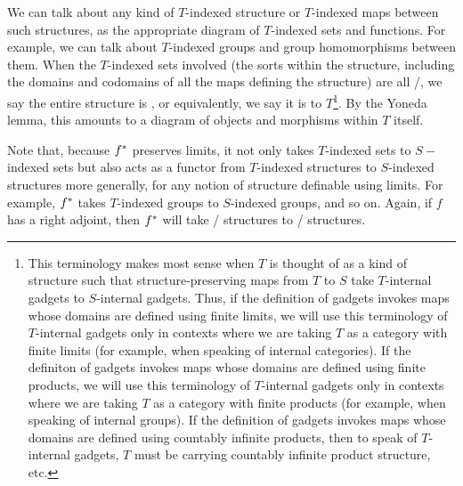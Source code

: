 \begin{definition}
We can talk about any kind of $T$-indexed structure or $T$-indexed maps between such structures, as the appropriate diagram of $T$-indexed sets and functions. For example, we can talk about $T$-indexed groups and group homomorphisms between them. When the $T$-indexed sets involved (the sorts within the structure, including the domains and codomains of all the maps defining the structure) are all \repsmall/, we say the entire structure is , or equivalently, we say it is  to $T$\footnote{This  terminology makes most sense when $T$ is thought of as a kind of structure such that structure-preserving maps from $T$ to $S$ take $T$-internal gadgets to $S$-internal gadgets. Thus, if the definition of gadgets invokes maps whose domains are defined using finite limits, we will use this terminology of $T$-internal gadgets only in contexts where we are taking $T$ as a category with finite limits (for example, when speaking of internal categories). If the definiton of gadgets invokes maps whose domains are defined using finite products, we will use this terminology of $T$-internal gadgets only in contexts where we are taking $T$ as a category with finite products (for example, when speaking of internal groups). If the definition of gadgets invokes maps whose domains are defined using countably infinite products, then to speak of $T$-internal gadgets, $T$ must be carrying countably infinite product structure, etc.}. By the Yoneda lemma, this amounts to a diagram of objects and morphisms within $T$ itself.
\end{definition}

Note that, because $f^*$ preserves limits, it not only takes $T$-indexed sets to $S-$indexed sets but also acts as a functor from $T$-indexed structures to $S$-indexed structures more generally, for any notion of structure definable using limits. For example, $f^*$ takes $T$-indexed groups to $S$-indexed groups, and so on. Again, if $f$ has a right adjoint, then $f^*$ will take \repsmall/ structures to \repsmall/ structures.


